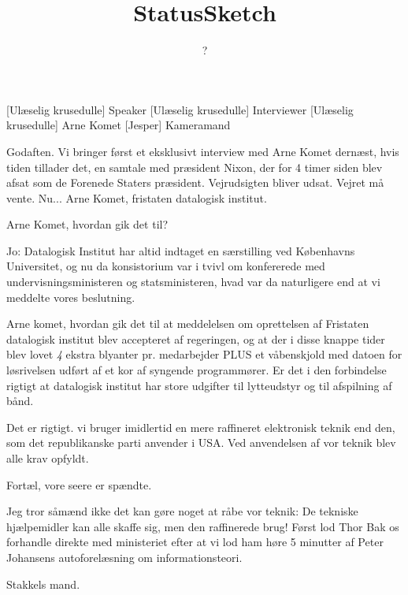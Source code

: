 \documentclass[a4paper,11pt]{article}
\title{StatusSketch}
\author{?}
\begin{document}
\maketitle

\begin{roles}
[Ulæselig krusedulle] Speaker
[Ulæselig krusedulle] Interviewer
[Ulæselig krusedulle] Arne Komet
[Jesper] Kameramand
\end{roles}

\begin{sketch}

 Godaften.  Vi bringer først et eksklusivt interview med Arne
Komet dernæst, hvis tiden tillader det, en samtale med præsident
Nixon, der for 4 timer siden blev afsat som de Forenede Staters
præsident.  Vejrudsigten bliver udsat.  Vejret må vente.  Nu... Arne
Komet, fristaten datalogisk institut.


 Arne Komet, hvordan gik det til?

 Jo: Datalogisk Institut har altid indtaget en særstilling ved
Københavns Universitet, og nu da konsistorium var i tvivl om
konfererede med undervisningsministeren og statsministeren, hvad var
da naturligere end at vi meddelte vores beslutning.

 Arne komet, hvordan gik det til at meddelelsen om oprettelsen
af Fristaten datalogisk institut blev accepteret af regeringen, og at
der i disse knappe tider blev lovet {\em 4} ekstra blyanter
pr. medarbejder PLUS et våbenskjold med datoen for løsrivelsen udført
af et kor af syngende programmører.  Er det i den forbindelse rigtigt
at datalogisk institut har store udgifter til lytteudstyr og til
afspilning af bånd.

 Det er rigtigt.  vi bruger imidlertid en mere raffineret
elektronisk teknik end den, som det republikanske parti anvender i
USA.  Ved anvendelsen af vor teknik blev alle krav opfyldt.

 Fortæl, vore seere er spændte.

 Jeg tror såmænd ikke det kan gøre noget at råbe vor teknik:
De tekniske hjælpemidler kan alle skaffe sig, men den raffinerede
brug!  Først lod Thor Bak os forhandle direkte med ministeriet efter
at vi lod ham høre 5 minutter af Peter Johansens autoforelæsning om
informationsteori.

 Stakkels mand.


\end{sketch}
\end{document}
